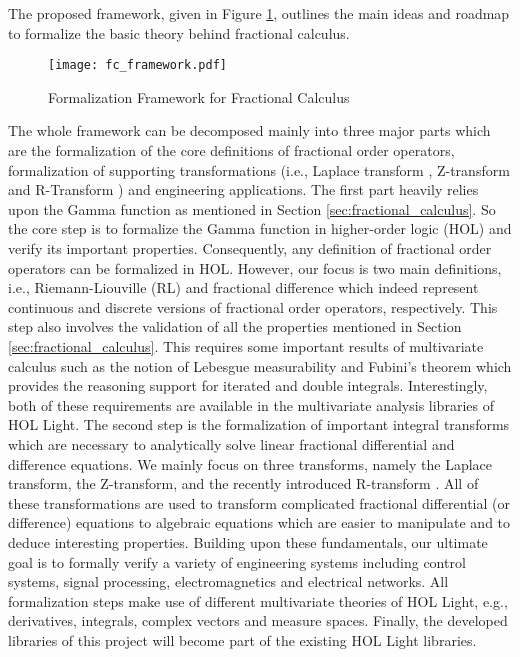 \documentclass {llncs}
\begin{document}
The proposed framework, given in Figure \ref{fig:proposed}, outlines the main ideas and roadmap to
formalize the basic theory behind fractional calculus.
\begin{figure}[h]
  \centering
{\texttt{[image: fc\_framework.pdf]}}
\caption{Formalization Framework for Fractional Calculus}
\label{fig:proposed} \end{figure}
The whole framework can be decomposed mainly into three major parts which are the
formalization of the core definitions of fractional order operators, formalization of
supporting transformations (i.e., Laplace transform \cite{ogata_modern}, Z-transform \cite{DSP_OPENHEIUM}  and R-Transform \cite{R-transform}) and
engineering applications. The first part heavily relies upon the Gamma function
as mentioned in Section \ref{sec:fractional_calculus}. So the core step is to formalize the
Gamma function in higher-order logic (HOL) and verify its important properties. Consequently, any definition of
fractional order operators can be formalized in HOL. However, our focus is two main definitions, i.e.,
Riemann-Liouville (RL) and fractional difference which indeed represent continuous and discrete versions of
fractional order operators, respectively.  This step also involves the validation of all the properties mentioned
in Section \ref{sec:fractional_calculus}. This requires some important results of multivariate
calculus such as the notion of Lebesgue measurability and Fubini's theorem which provides the reasoning support for
iterated and double integrals. Interestingly, both of these requirements are available in the multivariate
analysis libraries of HOL Light. The second step is the formalization of important integral transforms which are necessary to
analytically solve linear fractional differential and difference equations. We mainly focus on three transforms, namely the Laplace
 transform, the Z-transform, and the recently introduced R-transform \cite{R_TRANSFORM}. All of these transformations
are used to transform complicated fractional differential (or difference) equations to algebraic equations which
are easier to manipulate and to deduce interesting properties.
Building upon these fundamentals, our ultimate goal is to formally verify a variety of
engineering systems including  control systems, signal processing, electromagnetics and
electrical networks. All formalization steps make use of different multivariate theories of
HOL Light, e.g., derivatives, integrals, complex vectors and measure spaces. Finally,
the developed libraries of this project will become part of the existing HOL Light libraries.
\end{document}
